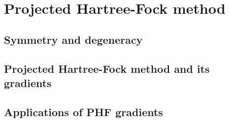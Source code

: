 \chapter{Projected Hartree-Fock method
\label{ch:projected_hartree_fock}}
\section{Symmetry and degeneracy}

\section{Projected Hartree-Fock method and its gradients}

\section{Applications of PHF gradients}